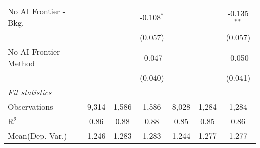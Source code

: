 \begin{tabular}{lcccccc}
   No AI Frontier - Bkg.   &         &         & -0.108$^{*}$ &         &         & -0.135$^{**}$\\   
                           &         &         & (0.057)      &         &         & (0.057)\\   
   No AI Frontier - Method &         &         & -0.047       &         &         & -0.050\\   
                           &         &         & (0.040)      &         &         & (0.041)\\   
   \midrule
   \emph{Fit statistics}\\
   Observations            & 9,314   & 1,586   & 1,586        & 8,028   & 1,284   & 1,284\\  
   R$^2$                   & 0.86    & 0.88    & 0.88         & 0.85    & 0.85    & 0.86\\  
Mean(Dep. Var.) & 1.246 & 1.283 & 1.283 & 1.244 & 1.277 & 1.277 \\
   

\end{tabular}
